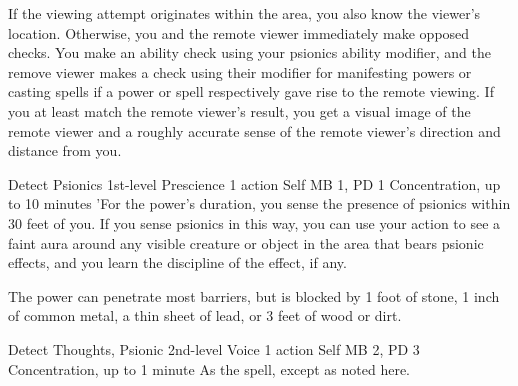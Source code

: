 If the viewing attempt originates within the area, you also
know the viewer's location. Otherwise, you and the remote
viewer immediately make opposed checks. You make an ability
check using your psionics ability modifier, and the remove
viewer makes a check using their modifier for manifesting
powers or casting spells if a power or spell respectively
gave rise to the remote viewing. If you at least match the
remote viewer's result, you get a visual image of the remote
viewer and a roughly accurate sense of the remote viewer's
direction and distance from you.

\DndPowerHeader%
    {Detect Psionics\label{pwr:detect_psionics}}
    {1st-level Prescience}
    {1 action}
    {Self}
    {MB 1, PD 1}
    {Concentration, up to 10 minutes}
'For the power's duration, you sense the
presence of psionics within 30 feet of you. If you sense psionics
in this way, you can use your action to see a faint aura around
any visible creature or object in the area that bears psionic
effects, and you learn the discipline of the effect, if any.

The power can penetrate most barriers, but is blocked by 1
foot of stone, 1 inch of common metal, a thin sheet of lead,
or 3 feet of wood or dirt.

\DndPowerHeader%
    {Detect Thoughts, Psionic\label{pwr:detect_thoughts_psionic}}
    {2nd-level Voice}
    {1 action}
    {Self}
    {MB 2, PD 3}
    {Concentration, up to 1 minute}
As the  spell, except
as noted here.

